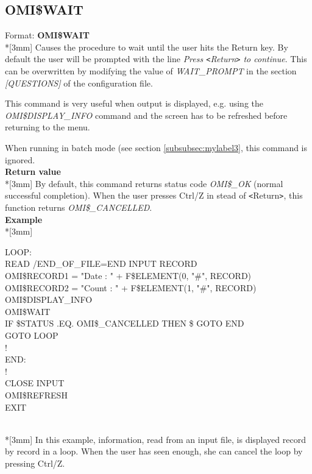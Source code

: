 \documentclass[a4paper]{book}
\newcommand{\vs}{\vspace{3mm}}
\newcommand{\lt}{\texttt{<}}
\newcommand{\gt}{\texttt{>}}
\renewcommand{\indent}{\hspace*{5mm}}
\begin{document}
\subsection{OMI{\$}WAIT}
\label{subsubsec:mylabel64}

\indent Format: \textbf{OMI{\$}WAIT}\\*[3mm]
Causes the procedure to wait until the user hits the Return key. By default 
the user will be prompted with the line \textsl{Press \lt Return\gt{} to continue}. This can be overwritten by 
modifying the value of \textsl{WAIT{\_}PROMPT} in the section \textsl{[QUESTIONS]} of the 
configuration file.

This command is very useful when output is displayed, e.g. using the 
\textsl{OMI{\$}DISPLAY{\_}INFO} 
command and the screen has to be refreshed before returning to the menu.

\vs

When running in batch mode (see section \ref{subsubsec:mylabel3}, this command
is ignored.\\[3mm]
\textbf{Return value}\\*[3mm]
By default, this command returns status code \textsl{OMI{\$}{\_}OK} (normal 
successful completion). When the user presses Ctrl/Z in stead of \lt Return\gt, 
this function returns \textsl{OMI{\$}{\_}CANCELLED}.\\[3mm]
\textbf{Example}\\*[3mm]
\begin{texttt}
\indent{\$}LOOP: \\
\indent{\$} READ /END{\_}OF{\_}FILE=END INPUT RECORD \\
\indent{\$} OMI{\$}RECORD1 = "Date : " + F{\$}ELEMENT(0, "{\#}", RECORD) \\
\indent{\$} OMI{\$}RECORD2 = "Count : " + F{\$}ELEMENT(1, "{\#}", RECORD) \\
\indent{\$} OMI{\$}DISPLAY{\_}INFO \\
\indent{\$} OMI{\$}WAIT \\
\indent{\$} IF {\$}STATUS .EQ. OMI{\$}{\_}CANCELLED THEN {\$} GOTO END \\
\indent{\$} GOTO LOOP \\
\indent{\$}! \\
\indent{\$}END: \\
\indent{\$}! \\
\indent{\$} CLOSE INPUT \\
\indent{\$} OMI{\$}REFRESH \\
\indent{\$} EXIT \\
\end{texttt}\\*[3mm]
In this example, information, read from an input file, is displayed record 
by record in a loop. When the user has seen enough, she can cancel the loop 
by pressing Ctrl/Z.
\end{document}
